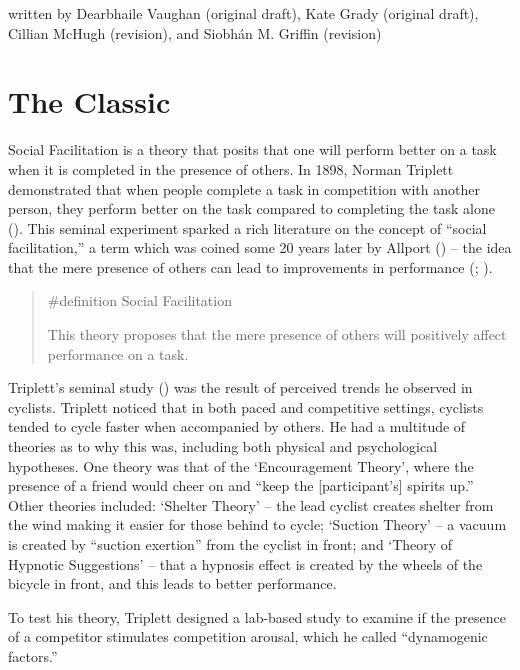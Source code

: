 \documentclass[
  letterpaper,
]{book}
\begin{document}
{written by Dearbhaile Vaughan (original draft), Kate Grady (original
draft), Cillian McHugh (revision), and Siobhán M. Griffin (revision)}

\section{The Classic}\label{the-classic-9}

Social Facilitation is a theory that posits that one will perform better
on a task when it is completed in the presence of others. In 1898,
Norman Triplett demonstrated that when people complete a task in
competition with another person, they perform better on the task
compared to completing the task alone
(). This seminal experiment
sparked a rich literature on the concept of ``social facilitation,'' a
term which was coined some 20 years later by Allport
() -- the idea that the mere presence
of others can lead to improvements in performance
(;
).

\begin{quote}
\label{def-socialfacilitation}{\#definition} Social
Facilitation

This theory proposes that the mere presence of others will positively
affect performance on a task.
\end{quote}

Triplett's seminal study () was the
result of perceived trends he observed in cyclists. Triplett noticed
that in both paced and competitive settings, cyclists tended to cycle
faster when accompanied by others. He had a multitude of theories as to
why this was, including both physical and psychological hypotheses. One
theory was that of the `Encouragement Theory', where the presence of a
friend would cheer on and ``keep the {[}participant's{]} spirits up.''
Other theories included: `Shelter Theory' -- the lead cyclist creates
shelter from the wind making it easier for those behind to cycle;
`Suction Theory' -- a vacuum is created by ``suction exertion'' from the
cyclist in front; and `Theory of Hypnotic Suggestions' -- that a
hypnosis effect is created by the wheels of the bicycle in front, and
this leads to better performance.

To test his theory, Triplett designed a lab-based study to examine if
the presence of a competitor stimulates competition arousal, which he
called ``dynamogenic factors.''
\end{document}
